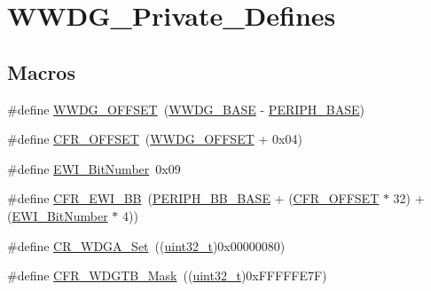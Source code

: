 \hypertarget{group___w_w_d_g___private___defines}{}\section{W\+W\+D\+G\+\_\+\+Private\+\_\+\+Defines}
\label{group___w_w_d_g___private___defines}
\subsection*{Macros}
\begin{DoxyCompactItemize}
\item 
\#define \hyperlink{group___w_w_d_g___private___defines_gab6dcdf2385dd7317ec775e146cff40ca}{W\+W\+D\+G\+\_\+\+O\+F\+F\+S\+ET}~(\hyperlink{openmotestm_2library_2inc_2stm32f10x__map_8h_a9a5bf4728ab93dea5b569f5b972cbe62}{W\+W\+D\+G\+\_\+\+B\+A\+SE} -\/ \hyperlink{openmotestm_2library_2inc_2stm32f10x__map_8h_a9171f49478fa86d932f89e78e73b88b0}{P\+E\+R\+I\+P\+H\+\_\+\+B\+A\+SE})
\item 
\#define \hyperlink{group___w_w_d_g___private___defines_ga3e0f9d9f7f69a6d133bba721e25aca4a}{C\+F\+R\+\_\+\+O\+F\+F\+S\+ET}~(\hyperlink{openmotestm_2library_2src_2stm32f10x__wwdg_8c_ab6dcdf2385dd7317ec775e146cff40ca}{W\+W\+D\+G\+\_\+\+O\+F\+F\+S\+ET} + 0x04)
\item 
\#define \hyperlink{group___w_w_d_g___private___defines_ga97c9005823520f5aaefe211923b48215}{E\+W\+I\+\_\+\+Bit\+Number}~0x09
\item 
\#define \hyperlink{group___w_w_d_g___private___defines_gaa48804210cea547f0e0f4ca49c44fc94}{C\+F\+R\+\_\+\+E\+W\+I\+\_\+\+BB}~(\hyperlink{openmotestm_2library_2inc_2stm32f10x__map_8h_aed7efc100877000845c236ccdc9e144a}{P\+E\+R\+I\+P\+H\+\_\+\+B\+B\+\_\+\+B\+A\+SE} + (\hyperlink{openmotestm_2library_2src_2stm32f10x__wwdg_8c_a3e0f9d9f7f69a6d133bba721e25aca4a}{C\+F\+R\+\_\+\+O\+F\+F\+S\+ET} $\ast$ 32) + (\hyperlink{openmotestm_2library_2src_2stm32f10x__wwdg_8c_a97c9005823520f5aaefe211923b48215}{E\+W\+I\+\_\+\+Bit\+Number} $\ast$ 4))
\item 
\#define \hyperlink{group___w_w_d_g___private___defines_ga4c66a66daa0e09782e8b2248db9b35f6}{C\+R\+\_\+\+W\+D\+G\+A\+\_\+\+Set}~((\hyperlink{_p_e___types_8h_a33594304e786b158f3fb30289278f5af}{uint32\+\_\+t})0x00000080)
\item 
\#define \hyperlink{group___w_w_d_g___private___defines_ga2b74f53d33f15b272b2d1ef78a78a2cc}{C\+F\+R\+\_\+\+W\+D\+G\+T\+B\+\_\+\+Mask}~((\hyperlink{_p_e___types_8h_a33594304e786b158f3fb30289278f5af}{uint32\+\_\+t})0x\+F\+F\+F\+F\+F\+E7\+F)

\end{DoxyCompactItemize}
